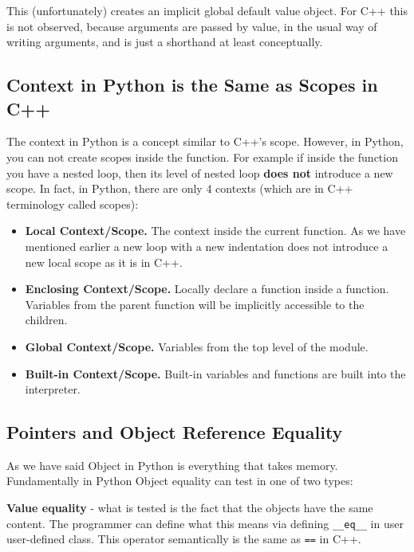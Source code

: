\documentclass[
]{article}
\begin{document}
This (unfortunately) creates an implicit global default value object.
For C++ this is not observed, because arguments are passed by value, in
the usual way of writing arguments, and is just a shorthand at least
conceptually.

\hypertarget{context-in-python-is-the-same-as-scopes-in-c}{%
\subsection{Context in Python is the Same as Scopes in
C++}\label{context-in-python-is-the-same-as-scopes-in-c}}

The context in Python is a concept similar to C++'s scope. However, in
Python, you can not create scopes inside the function. For example if
inside the function you have a nested loop, then its level of nested
loop \textbf{does not} introduce a new scope. In fact, in Python, there
are only 4 contexts (which are in C++ terminology called scopes):

\begin{itemize}
\item
  \textbf{Local Context/Scope.} The context inside the current function.
  As we have mentioned earlier a new loop with a new indentation does
  not introduce a new local scope as it is in C++.
\item
  \textbf{Enclosing Context/Scope.} Locally declare a function inside a
  function. Variables from the parent function will be implicitly
  accessible to the children.
\item
  \textbf{Global Context/Scope.} Variables from the top level of the
  module.
\item
  \textbf{Built-in Context/Scope.} Built-in variables and functions are
  built into the interpreter.
\end{itemize}

\hypertarget{pointers-and-object-reference-equality}{%
\subsection{Pointers and Object Reference
Equality}\label{pointers-and-object-reference-equality}}

As we have said Object in Python is everything that takes memory.
Fundamentally in Python Object equality can test in one of two types:

\textbf{Value equality} - what is tested is the fact that the objects
have the same content. The programmer can define what this means via
defining \texttt{\_\_eq\_\_} in user user-defined class. This operator
semantically is the same as \texttt{==} in C++.
\end{document}
